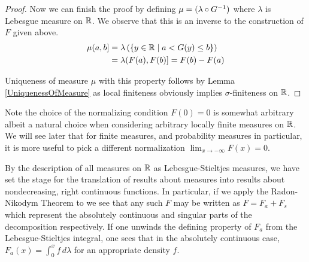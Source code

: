 \begin{proof}
Now we can finish the proof by 
defining $\mu = (\lambda \circ G^{-1})$ where $\lambda$ is Lebesgue
measure on $\mathbb{R}$.  We observe that this is an inverse to the
construction of $F$ given above.  
\begin{align*}
\mu (a,b] &= \lambda \left ( \lbrace y \in \mathbb{R} \mid a < G(y)  \leq b
  \rbrace \right ) \\
&= \lambda (F(a), F(b)] = F(b) - F(a)
\end{align*}

Uniqueness of measure $\mu$ with this property follows by Lemma
\ref{UniquenessOfMeasure} as local finiteness obviously implies
$\sigma$-finiteness on $\mathbb{R}$.
\end{proof}

Note the choice of the normalizing condition $F(0) = 0$ is somewhat
arbitrary albeit a natural choice when considering arbitrary locally
finite measures on $\mathbb{R}$.  We will see later that for finite
measures, and probability
measures in particular, it is more useful to pick a different
normalization $\lim_{x \to -\infty} F(x) = 0$.

By the description of all measures on $\mathbb{R}$ as
Lebesgue-Stieltjes measures, we have set the stage for the
translation of results about measures into results about
nondecreasing, right continuous functions.  In particular, if we apply
the Radon-Nikodym Theorem to we see that any such $F$ may be written
as $F = F_a + F_s$ which represent the absolutely continuous and
singular parts of the decomposition respectively.  If one unwinds the
defining property of $F_a$ from the Lebesgue-Stieltjes integral, one
sees
 that in the absolutely continuous case, $F_a(x) = \int_0^x f \,
 d\lambda$ for an appropriate density $f$.

